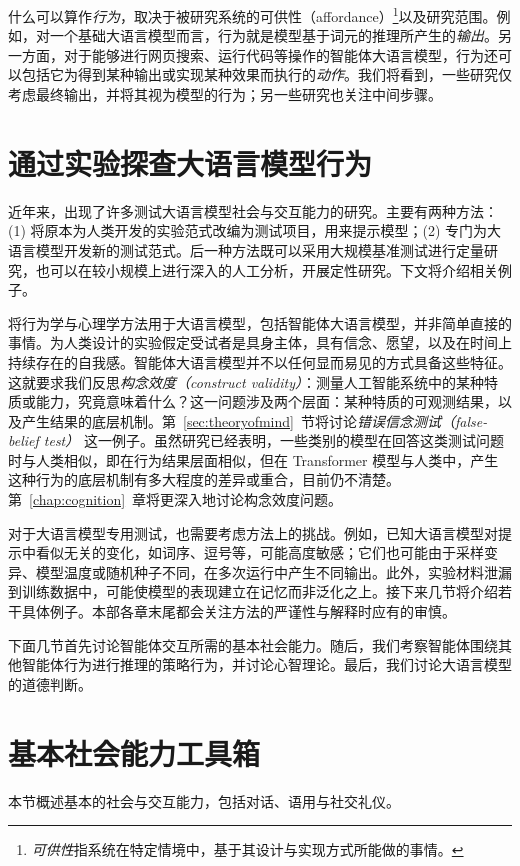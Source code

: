 什么可以算作\emph{行为}，取决于被研究系统的可供性（affordance）\footnote{{\em 可供性}指系统在特定情境中，基于其设计与实现方式所能做的事情。}以及研究范围。例如，对一个基础大语言模型而言，行为就是模型基于词元的推理所产生的{\em 输出}。另一方面，对于能够进行网页搜索、运行代码等操作的智能体大语言模型，行为还可以包括它为得到某种输出或实现某种效果而执行的{\em 动作}。我们将看到，一些研究仅考虑最终输出，并将其视为模型的行为；另一些研究也关注中间步骤。

\section{通过实验探查大语言模型行为}
近年来，出现了许多测试大语言模型社会与交互能力的研究。主要有两种方法：(1) 将原本为人类开发的实验范式改编为测试项目，用来提示模型；(2) 专门为大语言模型开发新的测试范式。后一种方法既可以采用大规模基准测试进行定量研究，也可以在较小规模上进行深入的人工分析，开展定性研究。下文将介绍相关例子。

将行为学与心理学方法用于大语言模型，包括智能体大语言模型，并非简单直接的事情。为人类设计的实验假定受试者是具身主体，具有信念、愿望，以及在时间上持续存在的自我感。智能体大语言模型并不以任何显而易见的方式具备这些特征。这就要求我们反思\emph{构念效度（construct validity）}：测量人工智能系统中的某种特质或能力，究竟意味着什么？这一问题涉及两个层面：某种特质的可观测结果，以及产生结果的底层机制。第~\ref{sec:theoryofmind}~节将讨论{\em 错误信念测试（false-belief test）} \citep{carpenter2002new}这一例子。虽然研究已经表明，一些类别的模型在回答这类测试问题时与人类相似，即在行为结果层面相似，但在 Transformer 模型与人类中，产生这种行为的底层机制有多大程度的差异或重合，目前仍不清楚。第~\ref{chap:cognition}~章将更深入地讨论构念效度问题。

对于大语言模型专用测试，也需要考虑方法上的挑战。例如，已知大语言模型对提示中看似无关的变化，如词序、逗号等，可能高度敏感；它们也可能由于采样变异、模型温度或随机种子不同，在多次运行中产生不同输出。此外，实验材料泄漏到训练数据中，可能使模型的表现建立在记忆而非泛化之上。接下来几节将介绍若干具体例子。本部各章末尾都会关注方法的严谨性与解释时应有的审慎。

下面几节首先讨论智能体交互所需的基本社会能力。随后，我们考察智能体围绕其他智能体行为进行推理的策略行为，并讨论心智理论。最后，我们讨论大语言模型的道德判断。

\section{基本社会能力工具箱}
本节概述基本的社会与交互能力，包括对话、语用与社交礼仪。

